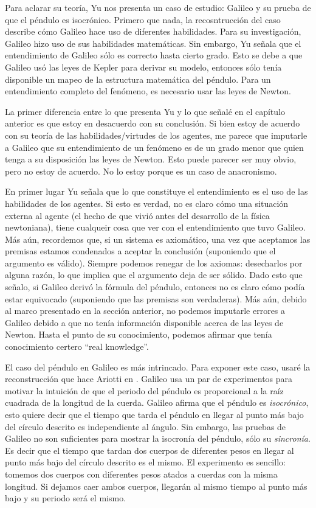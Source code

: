 Para aclarar su teoría, Yu nos presenta un caso de estudio: Galileo y su prueba de que el péndulo es isocrónico. Primero que nada, la recosntrucción del caso describe cómo Galileo hace uso de diferentes habilidades. Para su investigación, Galileo hizo uso de sus habilidades matemáticas. Sin embargo, Yu señala que el entendimiento de Galileo sólo es correcto hasta cierto grado. Esto se debe a que Galileo usó las leyes de Kepler para derivar su modelo, entonces sólo tenía disponible un mapeo de la estructura matemática del péndulo. Para un entendimiento completo del fenómeno, es necesario usar las leyes de Newton.

La primer diferencia entre lo que presenta Yu y lo que señalé en el capítulo anterior es que estoy en desacuerdo con su conclusión. Si bien estoy de acuerdo con su teoría de las habilidades/virtudes de los agentes, me parece que imputarle a Galileo que su entendimiento de un fenómeno es de un grado menor que quien tenga a su disposición las leyes de Newton. Esto puede parecer ser muy obvio, pero no estoy de acuerdo. No lo estoy porque es un caso de anacronismo.

En primer lugar Yu señala que lo que constituye el entendimiento es el uso de las habilidades de los agentes. Si esto es verdad, no es claro cómo una situación externa al agente (el hecho de que vivió antes del desarrollo de la física newtoniana), tiene cualqueir cosa que ver con el entendimiento que tuvo Galileo. Más aún, recordemos que, si un sistema es axiomático, una vez que aceptamos las premisas estamos condenados a aceptar la conclusión (suponiendo que el argumento es válido). Siempre podemos renegar de los axiomas: desecharlos por alguna razón, lo que implica que el argumento deja de ser sólido. Dado esto que señalo, si Galileo derivó la fórmula del péndulo, entonces no es claro cómo podía estar equivocado (suponiendo que las premisas son verdaderas). Más aún, debido al marco presentado en la sección anterior, no podemos imputarle errores a Galileo debido a que no tenía información disponible acerca de las leyes de Newton. Hasta el punto de su conocimiento, podemos afirmar que tenía conocimiento certero ``real knowledge''.

El caso del péndulo en Galileo es más intrincado. Para exponer este caso, usaré la reconstrucción que hace Ariotti en \citeyear{ariotti1968}. Galileo usa un par de experimentos para motivar la intuición de que el periodo del péndulo es proporcional a la raíz cuadrada de la longitud de la cuerda. Galileo afirma que el péndulo es \emph{isocrónico}, esto quiere decir que el tiempo que tarda el péndulo en llegar al punto más bajo del círculo descrito es independiente al ángulo. Sin embargo, las pruebas de Galileo no son suficientes para mostrar la isocronía del péndulo, sólo su \emph{sincronía}. Es decir que el tiempo que tardan dos cuerpos de diferentes pesos en llegar al punto más bajo del círculo descrito es el mismo. El experimento es sencillo: tomemos dos cuerpos con diferentes pesos atados a cuerdas con la misma longitud. Si dejamos caer ambos cuerpos, llegarán al mismo tiempo al punto más bajo y su periodo será el mismo.

